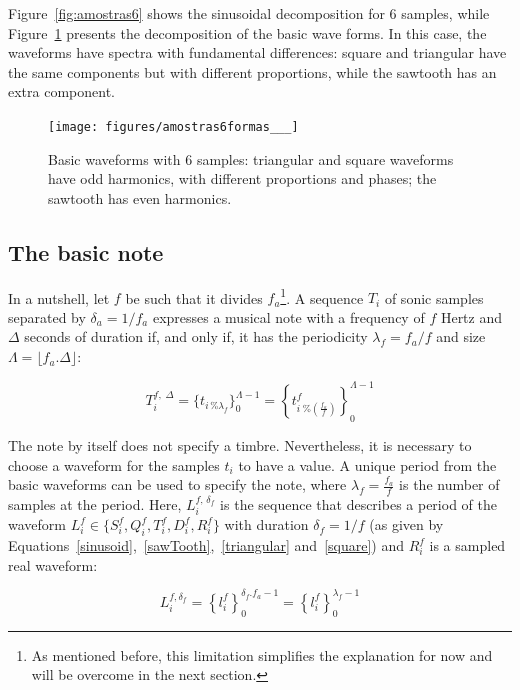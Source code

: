 Figure~\ref{fig:amostras6} shows the sinusoidal decomposition for 6 samples, while Figure~\ref{fig:formas6} presents the decomposition of the basic wave forms. In this case, the waveforms have spectra with fundamental differences: square and triangular have the same components but with different proportions, while the sawtooth has an extra component.

\begin{figure}
    \centering
        \texttt{[image: figures/amostras6formas\_\_\_]}
    \caption{Basic waveforms with 6 samples: triangular and square waveforms have odd harmonics, with different proportions and phases; the sawtooth has even harmonics.}
        \label{fig:formas6}
\end{figure}

\subsection{The basic note}\label{notaBasica}
In a nutshell, let $f$ be such that it divides $f_a$\footnote{As mentioned before, this limitation simplifies the explanation for now and will be overcome in the next section.}. A sequence $T_i$ of sonic samples separated by $\delta_a=1/f_a$ expresses a musical note with a frequency of $f$ Hertz and $\Delta$ seconds of duration if, and only if, it has the periodicity $\lambda_f=f_a/f$ and size $\Lambda=\lfloor f_a . \Delta \rfloor$:

\begin{equation}\label{eq:notaBasica}
T_i^{f,\; \Delta}=\{t_{i \, \% \lambda_f} \}_0^{\Lambda-1}= \left \{t^f_{i \; \% \left( \frac{f_a}{f} \right) } \right \}_0^{\Lambda-1}
\end{equation}

The note by itself does not specify a timbre. Nevertheless, it is necessary to choose a waveform for the samples $t_i$ to have a value. A unique period from the basic waveforms can be used to specify the note, where $\lambda_f=\frac{f_a}{f}$ is the number of samples at the period. Here, $L_i^{f,\, \delta_f} $ is the sequence that describes a period of the waveform $L_i^f \in \{S_i^f,Q_i^f,T_i^f,D_i^f,R_i^f \}$ with duration $\delta_f=1/f$ (as given by Equations~\ref{sinusoid},~\ref{sawTooth},~\ref{triangular} and~\ref{square}) and $R_i^f$ is a sampled real waveform:

\begin{equation}\label{periodoUnico}
L_i^{f , \delta_f } = \left\{ l_i^f \right\}_0^{\delta_f . f_a -1}=\left\{ l_i^f \right\}_0^{\lambda_f-1}
\end{equation}


